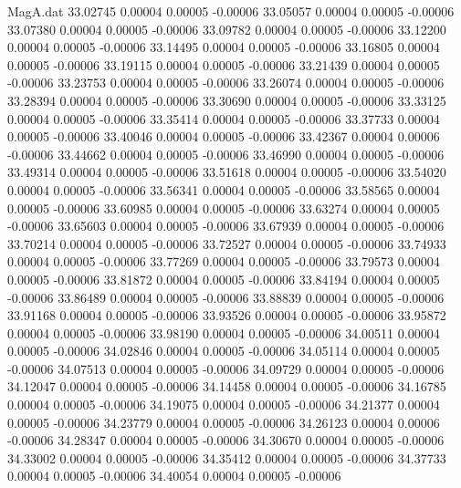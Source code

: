 \begin{filecontents}{MagA.dat}
  33.02745    0.00004    0.00005   -0.00006
  33.05057    0.00004    0.00005   -0.00006
  33.07380    0.00004    0.00005   -0.00006
  33.09782    0.00004    0.00005   -0.00006
  33.12200    0.00004    0.00005   -0.00006
  33.14495    0.00004    0.00005   -0.00006
  33.16805    0.00004    0.00005   -0.00006
  33.19115    0.00004    0.00005   -0.00006
  33.21439    0.00004    0.00005   -0.00006
  33.23753    0.00004    0.00005   -0.00006
  33.26074    0.00004    0.00005   -0.00006
  33.28394    0.00004    0.00005   -0.00006
  33.30690    0.00004    0.00005   -0.00006
  33.33125    0.00004    0.00005   -0.00006
  33.35414    0.00004    0.00005   -0.00006
  33.37733    0.00004    0.00005   -0.00006
  33.40046    0.00004    0.00005   -0.00006
  33.42367    0.00004    0.00006   -0.00006
  33.44662    0.00004    0.00005   -0.00006
  33.46990    0.00004    0.00005   -0.00006
  33.49314    0.00004    0.00005   -0.00006
  33.51618    0.00004    0.00005   -0.00006
  33.54020    0.00004    0.00005   -0.00006
  33.56341    0.00004    0.00005   -0.00006
  33.58565    0.00004    0.00005   -0.00006
  33.60985    0.00004    0.00005   -0.00006
  33.63274    0.00004    0.00005   -0.00006
  33.65603    0.00004    0.00005   -0.00006
  33.67939    0.00004    0.00005   -0.00006
  33.70214    0.00004    0.00005   -0.00006
  33.72527    0.00004    0.00005   -0.00006
  33.74933    0.00004    0.00005   -0.00006
  33.77269    0.00004    0.00005   -0.00006
  33.79573    0.00004    0.00005   -0.00006
  33.81872    0.00004    0.00005   -0.00006
  33.84194    0.00004    0.00005   -0.00006
  33.86489    0.00004    0.00005   -0.00006
  33.88839    0.00004    0.00005   -0.00006
  33.91168    0.00004    0.00005   -0.00006
  33.93526    0.00004    0.00005   -0.00006
  33.95872    0.00004    0.00005   -0.00006
  33.98190    0.00004    0.00005   -0.00006
  34.00511    0.00004    0.00005   -0.00006
  34.02846    0.00004    0.00005   -0.00006
  34.05114    0.00004    0.00005   -0.00006
  34.07513    0.00004    0.00005   -0.00006
  34.09729    0.00004    0.00005   -0.00006
  34.12047    0.00004    0.00005   -0.00006
  34.14458    0.00004    0.00005   -0.00006
  34.16785    0.00004    0.00005   -0.00006
  34.19075    0.00004    0.00005   -0.00006
  34.21377    0.00004    0.00005   -0.00006
  34.23779    0.00004    0.00005   -0.00006
  34.26123    0.00004    0.00006   -0.00006
  34.28347    0.00004    0.00005   -0.00006
  34.30670    0.00004    0.00005   -0.00006
  34.33002    0.00004    0.00005   -0.00006
  34.35412    0.00004    0.00005   -0.00006
  34.37733    0.00004    0.00005   -0.00006
  34.40054    0.00004    0.00005   -0.00006

\end{filecontents}
